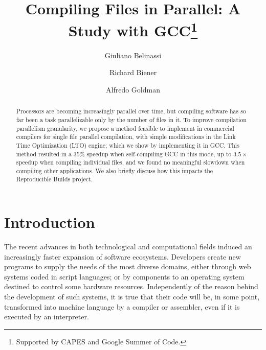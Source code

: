 \documentclass[runningheads]{llncs}
\begin{document}


%
\title{Compiling Files in Parallel: A Study with GCC\thanks{Supported by CAPES and Google Summer of Code.}}
%
%
\author{Giuliano Belinassi \and Richard Biener \and
Alfredo Goldman}
%
%

%
\maketitle              %
%
\begin{abstract}

Processors are becoming increasingly parallel over time, but compiling
software has so far been a task parallelizable only by the number of
files in it. To improve compilation parallelism granularity, we propose
a method feasible to implement in commercial compilers for single file
parallel compilation, with simple modifications in the Link Time
Optimization (LTO) engine; which we show by implementing
it in GCC. This method resulted in a 35\% speedup when self-compiling
GCC in this mode, up to $3.5\times$ speedup when compiling individual files,
and we found no meaningful slowdown when compiling other applications.
We also briefly discuss how this impacts the Reproducible Builds project.

\end{abstract}
%
%
%
\section{Introduction}

The recent advances in both technological and computational fields induced an
increasingly faster expansion of software ecosystems. Developers create new
programs to supply the needs of the most diverse domains, either through web
systems coded in script languages; or by components to an operating system
destined to control some hardware resources. Independently of the reason behind
the development of such systems, it is true that their code will be, in some
point, transformed into machine language by a compiler or assembler, even if it
is executed by an interpreter.
\end{document}
